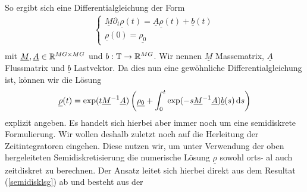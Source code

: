 So ergibt sich eine Differentialgleichung der Form
\begin{align*}
\begin{cases}
\underline{M} \partial_t \underline{\rho}(t) = \underline{A} \underline{\rho}(t) + \underline{b}(t) \\
\underline{\rho}(0) = \underline{\rho_0}
\end{cases}\\
\end{align*}
mit $ \underline{M},\underline{A} \in \mathbb{R}^{MG\times MG} $ und $ b: \mathbb{T} \to \mathbb{R}^{MG} $. Wir nennen  $ \underline{M} $ Massematrix, $ \underline{A} $ Flussmatrix und $ \underline{b} $ Lastvektor.
Da dies nun eine gewöhnliche Differentialgleichung ist, können wir die Lösung 
\begin{align}
 \label{semidisklsg}
 \underline{\rho}(t) = \exp(t \underline{M}^{-1} \underline{A}) \left( \underline{\rho_0} + \int_{0}^{t} \exp(-s\underline{M}^{-1} \underline{A}) \underline{b}(s) \, \mathrm{d} s \right)
\end{align}
explizit angeben.
Es handelt sich hierbei aber immer noch um eine semidiskrete Formulierung. 
Wir wollen deshalb zuletzt noch auf die Herleitung der Zeitintegratoren eingehen. Diese nutzen wir, um unter Verwendung der oben hergeleiteten Semidiskretisierung die numerische Lösung $ \underline{\rho} $ sowohl orts- al auch zeitdiskret zu berechnen. Der Ansatz leitet sich hierbei direkt aus dem Resultat (\ref{semidisklsg}) ab und besteht aus der 
